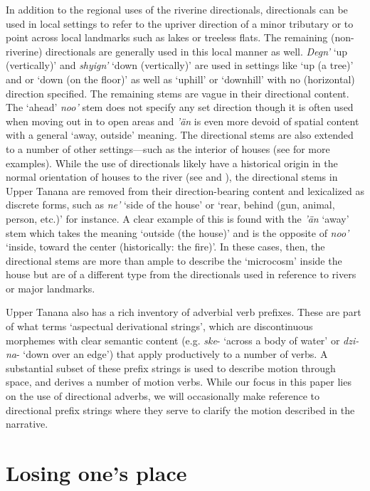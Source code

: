 In addition to the regional uses of the riverine directionals, directionals can be used in local settings to refer to the upriver direction of a minor tributary or to point across local landmarks such as lakes or treeless flats. The remaining (non-riverine) directionals are generally used in this local manner as well. {\em Degn'} `up (vertically)' and {\em shyign'} `down (vertically)' are used in settings like `up (a tree)' and or `down (on the floor)' as well as `uphill' or `downhill' with no (horizontal) direction specified. The remaining stems are vague in their directional content. The `ahead' {\em noo'} stem does not specify any set direction though it is often used when moving out in to open areas and {\em 'än} is even more devoid of spatial content with a general `away, outside' meaning. The directional stems are also extended to a number of other settings—such as the interior of houses (see \citealp[131]{KariJ2010} for more examples). While the use of directionals likely have a historical origin in the normal orientation of houses to the river (see \citealp{FortescueM2011} and \citealp[602]{LeerJ1989}), the directional stems in Upper Tanana are removed from their direction-bearing content and lexicalized as discrete forms, such as {\em ne'} `side of the house' or `rear, behind (gun, animal, person, etc.)' for instance. A clear example of this is found with the {\em 'än} `away' stem which takes the meaning `outside (the house)' and is the opposite of {\em noo'} `inside, toward the center (historically: the fire)'. In these cases, then, the directional stems are more than ample to describe the `microcosm' \citep[7]{FortescueM2011} inside the house but are of a different type from the directionals used in reference to rivers or major landmarks.

Upper Tanana also has a rich inventory of adverbial verb prefixes. These are part of what \citet[28]{KariJ1979} terms `aspectual derivational strings', which are discontinuous morphemes with clear semantic content (e.g. {\em ske}- `across a body of water' or {\em dzi-na}- `down over an edge') that apply productively to a number of verbs. A substantial subset of these prefix strings is used to describe motion through space, and derives a number of motion verbs. While our focus in this paper lies on the use of directional adverbs, we will occasionally make reference to directional prefix strings where they serve to clarify the motion described in the narrative.

\section{Losing one's place}
\label{brucks:section:losing-direction}

